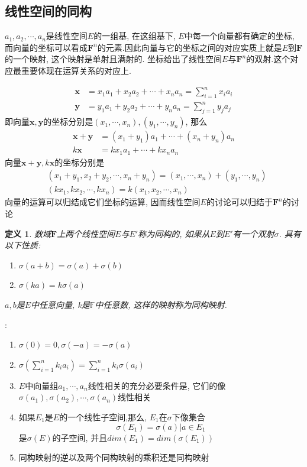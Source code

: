 \documentclass[a4paper,11pt]{article}
\newtheorem{definition}{\hspace{2em}定义}[section]
\begin{document}
\subsection{线性空间的同构}
$a_1,a_2,\cdots,a_n$是线性空间$E$的一组基, 在这组基下, $E$中每一个向量都有确定的坐标, 而向量的坐标可以看成$\mathbf{F}^n$的元素.因此向量与它的坐标之间的对应实质上就是$E$到$\mathbf{F}$的一个映射, 这个映射是单射且满射的. 坐标给出了线性空间$E$与$\mathbf{F}^n$的双射.这个对应最重要体现在运算关系的对应上.

\begin{equation*}
\begin{split}
   \mathbf{x}&=x_1a_1+x_2a_2+\cdots+x_na_n=\sum_{i=1}^{n}x_ia_i \\
   \mathbf{y}&=y_1a_1+y_2a_2+\cdots+y_na_n=\sum_{j=1}^{n}y_ja_j
\end{split}
\end{equation*}
即向量$\mathbf{x},\mathbf{y}$的坐标分别是$(x_1,\cdots,x_n),(y_1,\cdots,y_n)$, 那么
\begin{equation*}
\begin{split}
  \mathbf{x}+\mathbf{y}&=(x_1+y_1)a_1+\cdots+(x_n+y_n)a_n\\
  k\mathbf{x}&=kx_1a_1+\cdots+kx_na_n
\end{split}
\end{equation*}
向量$\mathbf{x}+\mathbf{y},k\mathbf{x}$的坐标分别是
\begin{equation*}
\begin{split}
  &(x_1+y_1,x_2+y_2,\cdots,x_n+y_n)=(x_1,\cdots,x_n)+(y_1,\cdots,y_n)\\
  &(kx_1,kx_2,\cdots,kx_n)=k(x_1,x_2,\cdots,x_n)
\end{split}
\end{equation*}
向量的运算可以归结成它们坐标的运算, 因而线性空间$E$的讨论可以归结于$\mathbf{F}^n$的讨论
\begin{definition}
  数域$\mathbf{F}$上两个线性空间$E$与$E'$称为同构的, 如果从$E$到$E'$有一个双射$\sigma$. 具有以下性质:
  \begin{enumerate}[(1)]
    \item $\sigma(a+b)=\sigma(a)+\sigma(b)$
    \item $\sigma(ka)=k\sigma(a)$
  \end{enumerate}
  $a,b$是$E$中任意向量, k是$\mathbb{F}$中任意数, 这样的映射称为同构映射.
\end{definition}
:
\begin{enumerate}[(1)]
  \item $\sigma(0)=0,\sigma(-a)=-\sigma(a)$
  \item $\sigma(\sum_{i=1}^{n}k_ia_i)=\sum_{i=1}^{n}k_i\sigma(a_i)$
  \item $E$中向量组$a_1,\cdots,a_n$线性相关的充分必要条件是, 它们的像$\sigma(a_1),\sigma(a_2),\cdots,\sigma(a_n)$线性相关
  \item 如果$E_1$是$E$的一个线性子空间,那么, $E_1$在$\sigma$下像集合
  \begin{equation*}
    \sigma(E_1)={\sigma(a)|a\in E_1}
  \end{equation*}
  是$\sigma(E)$的子空间, 并且$dim(E_1)=dim(\sigma(E_1))$
  \item 同构映射的逆以及两个同构映射的乘积还是同构映射
\end{enumerate}
\end{document}
